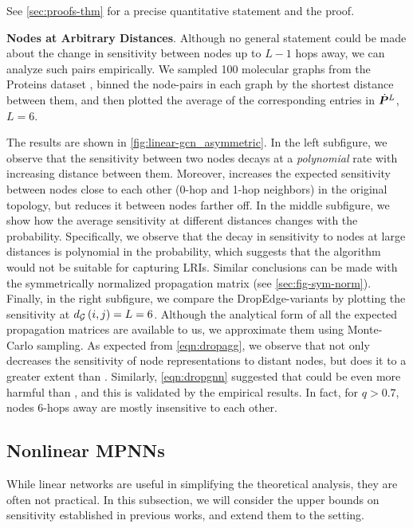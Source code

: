 See \autoref{sec:proofs-thm} for a precise quantitative statement and the proof.

\textbf{Nodes at Arbitrary Distances}. Although no general statement could be made about the change in sensitivity between nodes up to $L-1$ hops away, we can analyze such pairs empirically. We sampled 100 molecular graphs from the Proteins dataset \citep{dobson2003proteins}, %
binned the node-pairs in each graph by the shortest distance between them, and then plotted the average of the corresponding entries in $\dot{\bm{P}}^L$, $L=6$. 

The results are shown in \autoref{fig:linear-gcn_asymmetric}. In the left subfigure, we observe that the sensitivity between two nodes decays at a \textit{polynomial} rate with increasing distance between them. Moreover,  increases the expected sensitivity between nodes close to each other (0-hop and 1-hop neighbors) in the original topology, but reduces it between nodes farther off. In the middle subfigure, we show how the average sensitivity at different distances changes with the  probability. Specifically, we observe that the decay in sensitivity to nodes at large distances is polynomial in the  probability, which suggests that the algorithm would not be suitable for capturing LRIs. Similar conclusions can be made with the symmetrically normalized propagation matrix (see \autoref{sec:fig-sym-norm}). Finally, in the right subfigure, we compare the DropEdge-variants by plotting the sensitivity at $d_{\mathcal{G}}\left(i,j\right) = L = 6$. Although the analytical form of all the expected propagation matrices are available to us, we approximate them using Monte-Carlo sampling. As expected from \autoref{eqn:dropagg}, we observe that  not only decreases the sensitivity of node representations to distant nodes, but does it to a greater extent than . Similarly, \autoref{eqn:dropgnn} suggested that  could be even more harmful than , and this is validated by the empirical results. In fact, for $q > 0.7$, nodes 6-hops away are mostly insensitive to each other.

\subsection{Nonlinear MPNNs}
\label{sec:nonlinear}

While linear networks are useful in simplifying the theoretical analysis, they are often not practical. In this subsection, we will consider the upper bounds on sensitivity established in previous works, and extend them to the  setting.

